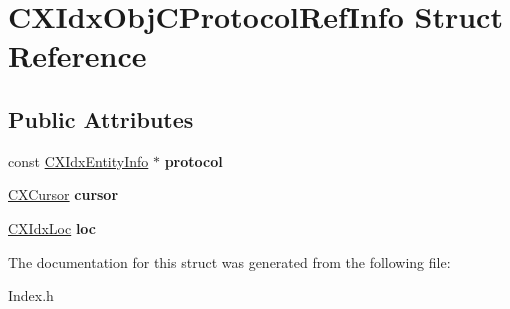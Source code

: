 \hypertarget{structCXIdxObjCProtocolRefInfo}{}\section{C\+X\+Idx\+Obj\+C\+Protocol\+Ref\+Info Struct Reference}
\label{structCXIdxObjCProtocolRefInfo}
\subsection*{Public Attributes}
\begin{DoxyCompactItemize}
\item 
\mbox{\label{structCXIdxObjCProtocolRefInfo_a3ea0012d6a535e26e288832ac9c8edc6}} 
const \mbox{\hyperlink{structCXIdxEntityInfo}{C\+X\+Idx\+Entity\+Info}} $\ast$ {\bfseries protocol}
\item 
\mbox{\label{structCXIdxObjCProtocolRefInfo_a580772bbae5a1af9f6ade5ee7196f2b4}} 
\mbox{\hyperlink{structCXCursor}{C\+X\+Cursor}} {\bfseries cursor}
\item 
\mbox{\label{structCXIdxObjCProtocolRefInfo_ae2a2bf9b63d43c4518ce5988e77a0ec7}} 
\mbox{\hyperlink{structCXIdxLoc}{C\+X\+Idx\+Loc}} {\bfseries loc}
\end{DoxyCompactItemize}


The documentation for this struct was generated from the following file\+:\begin{DoxyCompactItemize}
\item 
Index.\+h\end{DoxyCompactItemize}
